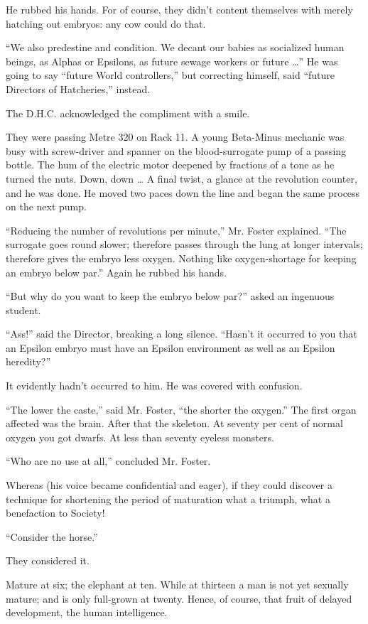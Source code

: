 \documentclass[12pt]{report}
\begin{document}
He rubbed his hands. For of course, they didn't content themselves with
merely hatching out embryos: any cow could do that.

``We also predestine and condition. We decant our babies as socialized
human beings, as Alphas or Epsilons, as future sewage workers or future
\ldots{}'' He was going to say ``future World controllers,'' but
correcting himself, said ``future Directors of Hatcheries,'' instead.

The D.H.C. acknowledged the compliment with a smile.

They were passing Metre 320 on Rack 11. A young Beta-Minus mechanic was
busy with screw-driver and spanner on the blood-surrogate pump of a
passing bottle. The hum of the electric motor deepened by fractions of a
tone as he turned the nuts. Down, down \ldots{} A final twist, a glance
at the revolution counter, and he was done. He moved two paces down the
line and began the same process on the next pump.

``Reducing the number of revolutions per minute,'' Mr. Foster explained.
``The surrogate goes round slower; therefore passes through the lung at
longer intervals; therefore gives the embryo less oxygen. Nothing like
oxygen-shortage for keeping an embryo below par.'' Again he rubbed his
hands.

``But why do you want to keep the embryo below par?'' asked an ingenuous
student.

``Ass!'' said the Director, breaking a long silence. ``Hasn't it
occurred to you that an Epsilon embryo must have an Epsilon environment
as well as an Epsilon heredity?''

It evidently hadn't occurred to him. He was covered with confusion.

``The lower the caste,'' said Mr. Foster, ``the shorter the oxygen.''
The first organ affected was the brain. After that the skeleton. At
seventy per cent of normal oxygen you got dwarfs. At less than seventy
eyeless monsters.

``Who are no use at all,'' concluded Mr. Foster.

Whereas (his voice became confidential and eager), if they could
discover a technique for shortening the period of maturation what a
triumph, what a benefaction to Society!

``Consider the horse.''

They considered it.

Mature at six; the elephant at ten. While at thirteen a man is not yet
sexually mature; and is only full-grown at twenty. Hence, of course,
that fruit of delayed development, the human intelligence.
\end{document}

